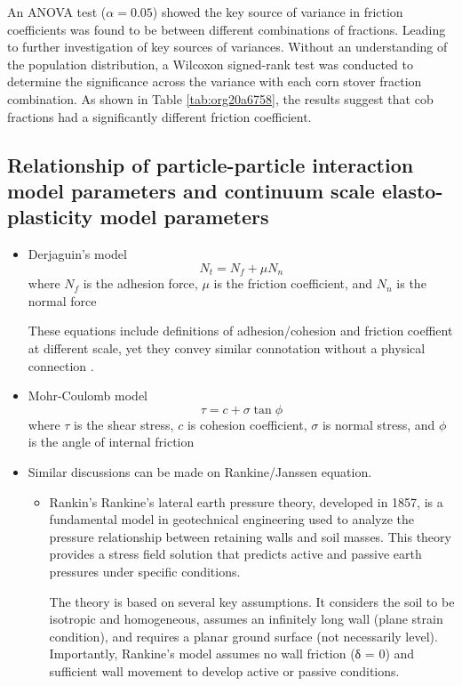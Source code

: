 \documentclass[xcolor=dvipsnames,10pt,hidelinks]{article}
\let\oldsubsection\subsection
\renewcommand{\subsection}{\clearpage\oldsubsection}
\begin{document}
An ANOVA test (\(\alpha = 0.05\)) showed the key source of variance in friction coefficients was found to be between different combinations of fractions. Leading to further investigation of key sources of variances.
Without an understanding of the population distribution, a Wilcoxon signed-rank test was conducted to determine the significance across the variance with each corn stover fraction combination.
As shown in Table \ref{tab:org20a6758}, the results suggest that cob fractions had a significantly different friction coefficient.
\subsection{Relationship of particle-particle interaction model parameters and continuum scale elasto-plasticity model parameters}
\label{sec:orge3b5b93}
\begin{itemize}
\item Derjaguin's model
\label{sec:org329d4e3}
\begin{equation}
  \label{eq:Derjaguin}
 N_t =  N_f + \mu N_n
\end{equation}
where \(N_f\) is the adhesion force, \(\mu\) is the friction coefficient, and \(N_n\) is the normal force

These equations include definitions of adhesion/cohesion and friction coeffient at different scale, yet they convey similar connotation without a physical connection  \parencite{reynolds_lvii_1885}.
\item Mohr-Coulomb model
\label{sec:org2889b10}
\begin{equation}
  \label{eq:mc}
  \tau = c + \sigma\tan\phi
\end{equation}
where \(\tau\) is the shear stress, \(c\) is cohesion coefficient, \(\sigma\) is normal stress, and \(\phi\) is the angle of internal friction
\item Similar discussions can be made on Rankine/Janssen equation.
\label{sec:org5f09e81}

\begin{itemize}
\item Rankin's
Rankine's lateral earth pressure theory, developed in 1857, is a fundamental model in geotechnical engineering used to analyze the pressure relationship between retaining walls and soil masses. This theory provides a stress field solution that predicts active and passive earth pressures under specific conditions.

The theory is based on several key assumptions. It considers the soil to be isotropic and homogeneous, assumes an infinitely long wall (plane strain condition), and requires a planar ground surface (not necessarily level). Importantly, Rankine's model assumes no wall friction (δ = 0) and sufficient wall movement to develop active or passive conditions.


\end{itemize}
\end{itemize}
\end{document}
